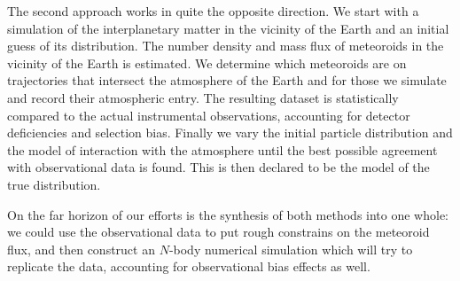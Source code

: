 The second approach works in quite the opposite direction. We start with a simulation
of the interplanetary matter in the vicinity of the Earth and an initial guess of its distribution.
The number density and mass flux of meteoroids in the vicinity of the Earth is estimated.
We determine which meteoroids are on trajectories that intersect the atmosphere of the Earth
and for those we simulate and record their atmospheric entry. The resulting dataset is statistically compared
to the actual instrumental observations, accounting for detector deficiencies and selection bias.
Finally we vary the initial particle distribution and the model of interaction with the atmosphere
until the best possible agreement with observational data is found.
This is then declared to be the model of the true distribution.

On the far horizon of our efforts is the synthesis of both methods into one whole:
we could use the observational data to put rough constrains on the meteoroid flux,
and then construct an $N$-body numerical simulation which will try to replicate the data,
accounting for observational bias effects as well.
